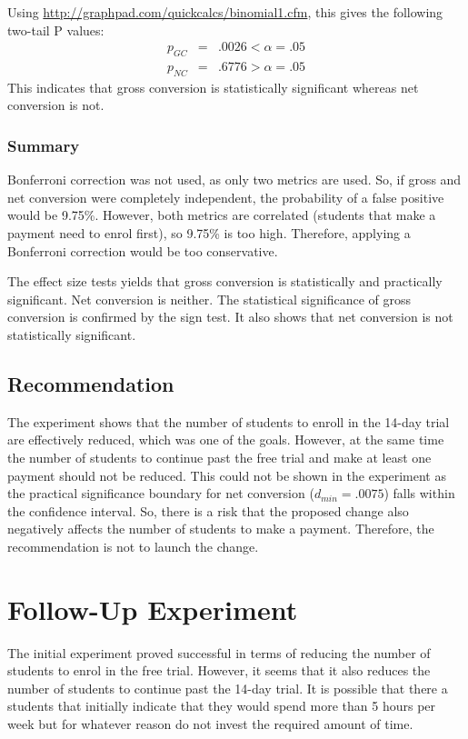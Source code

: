 \documentclass[11pt]{article} %
\begin{document}
Using \url{http://graphpad.com/quickcalcs/binomial1.cfm}, this gives the following two-tail P values:
\begin{eqnarray}
	p_{GC} &=& .0026 < \alpha = .05\\
      p_{NC} &=& .6776 > \alpha = .05
\end{eqnarray}
This indicates that gross conversion is statistically significant whereas net conversion is not.

\subsubsection{Summary}

Bonferroni correction was not used, as only two metrics are used. So, if gross and net conversion were completely independent, the probability of a false positive would be 9.75\%. However, both metrics are correlated (students that make a payment need to enrol first), so 9.75\% is too high. Therefore, applying a Bonferroni correction would be too conservative.

The effect size tests yields that gross conversion is statistically and practically significant. Net conversion is neither. The statistical significance of gross conversion is confirmed by the sign test. It also shows that net conversion is not statistically significant.

\subsection{Recommendation}

The experiment shows that the number of students to enroll in the 14-day trial are effectively reduced, which was one of the goals. However, at the same time the number of students to continue past the free trial and make at least one payment should not be reduced. This could not be shown in the experiment as the practical significance boundary for net conversion ($d_{min} = .0075$) falls within the confidence interval. So, there is a risk that the proposed change also negatively affects the number of students to make a payment. Therefore, the recommendation is not to launch the change.

\section{Follow-Up Experiment}

The initial experiment proved successful in terms of reducing the number of students to enrol in the free trial. However, it seems that it also reduces the number of students to continue past the 14-day trial. It is possible that there a students that initially indicate that they would spend more than 5 hours per week but for whatever reason do not invest the required amount of time. \medskip
\end{document}
